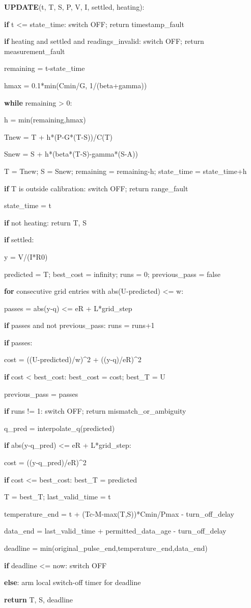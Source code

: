 \documentclass[11pt,letterpaper]{article}
\newenvironment{pseudocode}{\par\begingroup\small\setlength{\parskip}{0.15em}}{\endgroup\par}
\newcommand{\pcstep}[2]{\par\noindent\hspace*{#1em}\parbox[t]{\dimexpr\linewidth-#1em\relax}{\raggedright #2\strut}}
\begin{document}
\begin{pseudocode}
\pcstep{0.0}{\textbf{UPDATE}(t, T, S, P, V, I, settled, heating):}
\pcstep{1.0}{\textbf{if} t <= state\_\allowbreak{}time: switch OFF; return timestamp\_\allowbreak{}fault}
\pcstep{1.0}{\textbf{if} heating and settled and readings\_\allowbreak{}invalid: switch OFF; return measurement\_\allowbreak{}fault}
\pcstep{1.0}{remaining = t-state\_\allowbreak{}time}
\pcstep{1.0}{hmax = 0.1*min(Cmin/G, 1/(beta+gamma))}
\pcstep{1.0}{\textbf{while} remaining > 0:}
\pcstep{2.0}{h = min(remaining,hmax)}
\pcstep{2.0}{Tnew = T + h*(P-G*(T-S))/C(T)}
\pcstep{2.0}{Snew = S + h*(beta*(T-S)-gamma*(S-A))}
\pcstep{2.0}{T = Tnew; S = Snew; remaining = remaining-h; state\_\allowbreak{}time = state\_\allowbreak{}time+h}
\pcstep{2.0}{\textbf{if} T is outside calibration: switch OFF; return range\_\allowbreak{}fault}
\pcstep{1.0}{state\_\allowbreak{}time = t}
\pcstep{1.0}{\textbf{if} not heating: return T, S}
\pcstep{1.0}{\textbf{if} settled:}
\pcstep{2.0}{y = V/(I*R0)}
\pcstep{2.0}{predicted = T; best\_\allowbreak{}cost = infinity; runs = 0; previous\_\allowbreak{}pass = false}
\pcstep{2.0}{\textbf{for} consecutive grid entries with abs(U-predicted) <= w:}
\pcstep{3.0}{passes = abs(y-q) <= eR + L*grid\_\allowbreak{}step}
\pcstep{3.0}{\textbf{if} passes and not previous\_\allowbreak{}pass: runs = runs+1}
\pcstep{3.0}{\textbf{if} passes:}
\pcstep{4.0}{cost = ((U-predicted)/w)\textasciicircum{}2 + ((y-q)/eR)\textasciicircum{}2}
\pcstep{4.0}{\textbf{if} cost < best\_\allowbreak{}cost: best\_\allowbreak{}cost = cost; best\_\allowbreak{}T = U}
\pcstep{3.0}{previous\_\allowbreak{}pass = passes}
\pcstep{2.0}{\textbf{if} runs != 1: switch OFF; return mismatch\_\allowbreak{}or\_\allowbreak{}ambiguity}
\pcstep{2.0}{q\_\allowbreak{}pred = interpolate\_\allowbreak{}q(predicted)}
\pcstep{2.0}{\textbf{if} abs(y-q\_\allowbreak{}pred) <= eR + L*grid\_\allowbreak{}step:}
\pcstep{3.0}{cost = ((y-q\_\allowbreak{}pred)/eR)\textasciicircum{}2}
\pcstep{3.0}{\textbf{if} cost <= best\_\allowbreak{}cost: best\_\allowbreak{}T = predicted}
\pcstep{2.0}{T = best\_\allowbreak{}T; last\_\allowbreak{}valid\_\allowbreak{}time = t}
\pcstep{1.0}{temperature\_\allowbreak{}end = t + (Tc-M-max(T,S))*Cmin/Pmax - turn\_\allowbreak{}off\_\allowbreak{}delay}
\pcstep{1.0}{data\_\allowbreak{}end = last\_\allowbreak{}valid\_\allowbreak{}time + permitted\_\allowbreak{}data\_\allowbreak{}age - turn\_\allowbreak{}off\_\allowbreak{}delay}
\pcstep{1.0}{deadline = min(original\_\allowbreak{}pulse\_\allowbreak{}end,temperature\_\allowbreak{}end,data\_\allowbreak{}end)}
\pcstep{1.0}{\textbf{if} deadline <= now: switch OFF}
\pcstep{1.0}{\textbf{else}: arm local switch-off timer for deadline}
\pcstep{1.0}{\textbf{return} T, S, deadline}
\end{pseudocode}
\end{document}
